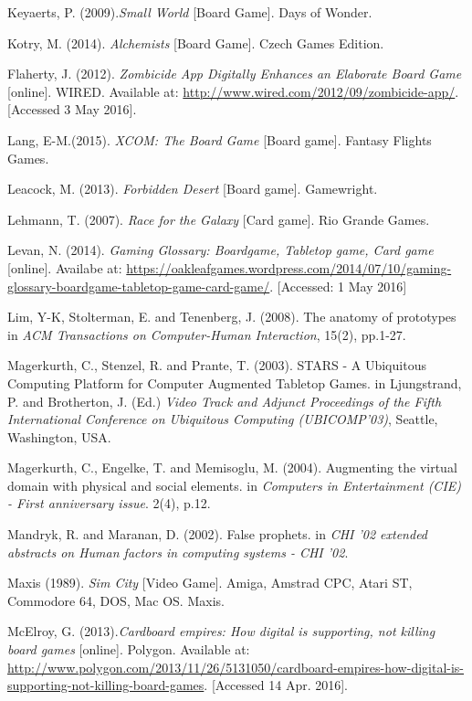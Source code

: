 \documentclass[a4paper,11pt]{report}
\begin{document}
\begin{thebibliography}{1}
Keyaerts, P. (2009).\textit{Small World} [Board Game]. Days of Wonder.

Kotry, M. (2014). \textit{Alchemists} [Board Game]. Czech Games Edition.

Flaherty, J. (2012). \textit{Zombicide App Digitally Enhances an Elaborate Board Game} [online]. WIRED. Available at: \url{http://www.wired.com/2012/09/zombicide-app/}. [Accessed 3 May 2016].

Lang, E-M.(2015). \textit{XCOM: The Board Game} [Board game]. Fantasy Flights Games.

Leacock, M. (2013). \textit{Forbidden Desert} [Board game].  Gamewright.

Lehmann, T. (2007). \textit{Race for the Galaxy} [Card game]. Rio Grande Games.

Levan, N. (2014). \textit{Gaming Glossary: Boardgame, Tabletop game, Card game} [online]. Availabe at: \url{https://oakleafgames.wordpress.com/2014/07/10/gaming-glossary-boardgame-tabletop-game-card-game/}. [Accessed: 1 May 2016]

Lim, Y-K, Stolterman, E. and Tenenberg, J. (2008). The anatomy of prototypes in \textit{ACM Transactions on Computer-Human Interaction}, 15(2), pp.1-27.

Magerkurth, C., Stenzel, R. and Prante, T. (2003). STARS - A Ubiquitous Computing Platform for Computer Augmented Tabletop Games. in Ljungstrand, P. and Brotherton, J. (Ed.) \textit{Video Track and Adjunct Proceedings of the Fifth
International Conference on Ubiquitous Computing (UBICOMP’03)}, Seattle, Washington, USA.

Magerkurth, C., Engelke, T. and Memisoglu, M. (2004). Augmenting the virtual domain with physical and social elements. in \textit{Computers in Entertainment (CIE) - First anniversary issue}. 2(4), p.12. 

Mandryk, R. and Maranan, D. (2002). False prophets. in \textit{CHI '02 extended abstracts on Human factors in computing systems - CHI '02}.

Maxis (1989). \textit{Sim City} [Video Game]. Amiga, Amstrad CPC, Atari ST, Commodore 64, DOS, Mac OS. Maxis.

McElroy, G. (2013).\textit{Cardboard empires: How digital is supporting, not killing board games} [online]. Polygon. Available at: \url{http://www.polygon.com/2013/11/26/5131050/cardboard-empires-how-digital-is-supporting-not-killing-board-games}. [Accessed 14 Apr. 2016].


\end{thebibliography}
\end{document}
